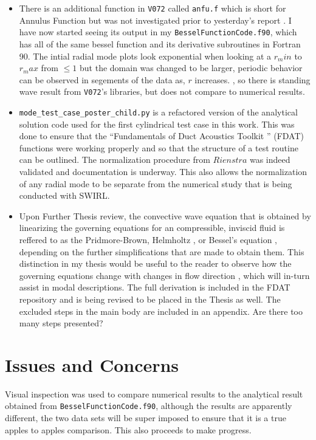 \documentclass[a4paper]{article}
\begin{document}
\begin{itemize}
    \item There is an additional function in \verb|V072| called \verb|anfu.f| which 
        is short for Annulus Function but was not investigated prior to yesterday's 
        report . I have now started seeing its output in my \verb|BesselFunctionCode.f90|,
        which has all of the same bessel function and its derivative subroutines 
        in Fortran 90. The intial radial mode plots look exponential when looking
        at a $r_min$ to $r_max$ from $\leq 1$ but the domain was changed to be larger,  
        periodic behavior can be observed in segements of the data as, $r$ increases.
         , so there is standing wave result from \verb|V072|'s libraries, but 
         does not compare to numerical results. 
    \item \verb|mode_test_case_poster_child.py| is a refactored version 
        of the analytical solution code used for the first cylindrical
        test case in this work. This was done to ensure that the ``Fundamentals
        of Duct Acoustics Toolkit '' (FDAT) functions were working properly 
        and so that the structure of a test routine can be outlined. The 
        normalization procedure from $Rienstra$ was indeed validated and documentation
        is underway. This also allows the normalization of any radial mode to be
        separate from the numerical study that is being conducted with SWIRL.
    \item Upon Further Thesis review, the convective wave equation that is 
        obtained by linearizing the governing equations for an 
        compressible, inviscid fluid is reffered to as the Pridmore-Brown, 
        Helmholtz , or Bessel's equation , depending on the further simplifications 
        that are made to obtain them. This distinction in my thesis would be useful 
        to the reader to observe how the governing equations change with changes
        in flow direction , which will in-turn assist in modal descriptions.
        The full derivation is included in the FDAT repository and is being revised 
        to be placed in the Thesis as well. The excluded steps in the main body
        are included in an appendix.  Are there too many steps presented?
\end{itemize}
\section{Issues and Concerns}
Visual inspection was used to compare numerical results to the analytical result
obtained from \verb|BesselFunctionCode.f90|, although the results are apparently different,
the two data sets will be super imposed to ensure that it is a true apples to 
apples comparison. This also proceeds to make progress.
\end{document}
